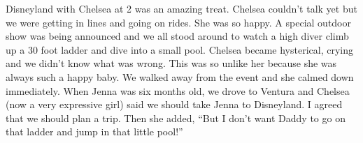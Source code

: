 Disneyland with Chelsea at 2 was an amazing treat. Chelsea couldn't talk yet
but we were getting in lines and going on rides. She was so happy.  A special
outdoor show was being announced and we all stood around to watch a high diver
climb up a 30 foot ladder and dive into a small pool. Chelsea became
hysterical, crying and we didn't know what was wrong. This was so unlike her
because she was always such a happy baby. We walked away from the event and she
calmed down immediately.  When Jenna was six months old, we drove to Ventura
and Chelsea (now a very expressive girl) said we should take Jenna to
Disneyland. I agreed that we should plan a trip. Then she added, ``But I don't
want Daddy to go on that ladder and jump in that little pool!''
